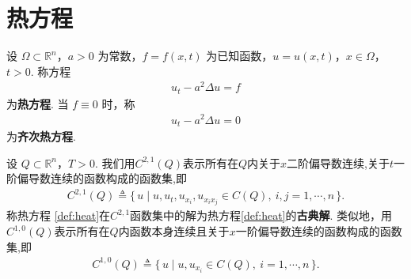\documentclass[../main.tex]{subfiles} %
\begin{document}
\chapter{热方程}

\begin{definition}
设 $\Omega\subset\mathbb{R}^n$，$a>0$ 为常数，$f=f(x,t)$ 为已知函数，$u=u(x,t)$，$x\in\Omega$，$t>0$. 称方程
\begin{align}
u_t - a^2\Delta u = f \label{def:heat}
\end{align}
为\textbf{热方程}. 当 $f\equiv 0$ 时，称
\begin{align}
u_t - a^2\Delta u = 0 \label{def:heat-hom}
\end{align}
为\textbf{齐次热方程}.
\end{definition}

\begin{definition}
设 $Q\subset\mathbb{R}^n$，$T>0$. 我们用$C^{2,1}(Q)$表示所有在$Q$内关于$x$二阶偏导数连续,关于$t$一阶偏导数连续的函数构成的函数集,即
\begin{align*}
C^{2,1}(Q) \triangleq \{\, u \mid u, u_t, u_{x_i}, u_{x_ix_j} \in C(Q),\ i,j=1,\cdots,n\,\}.
\end{align*}
称热方程 \eqref{def:heat}在$C^{2,1}$函数集中的解为热方程\eqref{def:heat}的\textbf{古典解}. 类似地，用$C^{1,0}(Q)$表示所有在$Q$内函数本身连续且关于$x$一阶偏导数连续的函数构成的函数集,即
\begin{align*}
C^{1,0}(Q) \triangleq \{\, u \mid u, u_{x_i} \in C(Q),\ i=1,\cdots,n\,\}.
\end{align*}
\end{definition}
\end{document}
